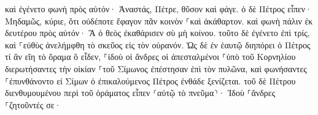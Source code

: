 \documentclass{openreader}
\begin{document}
καὶ ἐγένετο φωνὴ πρὸς αὐτόν· Ἀναστάς, Πέτρε, θῦσον καὶ φάγε. 
ὁ δὲ Πέτρος εἶπεν· Μηδαμῶς, κύριε, ὅτι οὐδέποτε ἔφαγον πᾶν κοινὸν ⸀καὶ ἀκάθαρτον. 
καὶ φωνὴ πάλιν ἐκ δευτέρου πρὸς αὐτόν· Ἃ ὁ θεὸς ἐκαθάρισεν σὺ μὴ κοίνου. 
τοῦτο δὲ ἐγένετο ἐπὶ τρίς, καὶ ⸀εὐθὺς ἀνελήμφθη τὸ σκεῦος εἰς τὸν οὐρανόν. 
Ὡς δὲ ἐν ἑαυτῷ διηπόρει ὁ Πέτρος τί ἂν εἴη τὸ ὅραμα ὃ εἶδεν, ⸀ἰδοὺ οἱ ἄνδρες οἱ ἀπεσταλμένοι ⸀ὑπὸ τοῦ Κορνηλίου διερωτήσαντες τὴν οἰκίαν ⸀τοῦ Σίμωνος ἐπέστησαν ἐπὶ τὸν πυλῶνα, 
καὶ φωνήσαντες ⸀ἐπυνθάνοντο εἰ Σίμων ὁ ἐπικαλούμενος Πέτρος ἐνθάδε ξενίζεται. 
τοῦ δὲ Πέτρου διενθυμουμένου περὶ τοῦ ὁράματος εἶπεν ⸂αὐτῷ τὸ πνεῦμα⸃· Ἰδοὺ ⸀ἄνδρες ⸀ζητοῦντές σε· 
\end{document}
